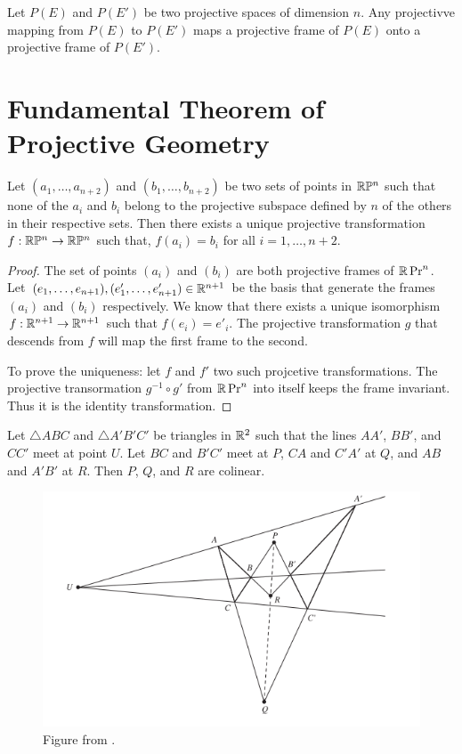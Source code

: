 \begin{prop}
  Let $P(E)$ and $P(E')$ be two projective spaces of dimension $n$. Any projectivve mapping from
  $P(E)$ to $P(E')$ maps a projective frame of $P(E)$ onto a projective frame of $P(E')$.
\end{prop}

\section{Fundamental Theorem of Projective Geometry}

\begin{theorem}
  \label{thm:fundprojgeo}
  Let $(a_1,\ldots,a_{n+2})$ and $(b_1,\ldots,b_{n+2})$ be two sets of points in $\mathbb{R}\mathbb{P}^n$ such
  that none of the $a_i$ and $b_i$ belong to the projective subspace defined by $n$ of the others
  in their respective sets. Then there exists a unique projective transformation
  $f:\mathbb{R}\mathbb{P}^n\rightarrow\mathbb{R}\mathbb{P}^n$ such that, $f(a_i)=b_i$ for all $i=1,\ldots,n+2$.
\end{theorem}

\begin{proof}
  The set of points $(a_i)$ and $(b_i)$ are both projective frames of $\mathbb{R}\Pr^n$. Let
  $(e_1,\ldots,e_{n+1}),(e'_1,\ldots,e'_{n+1})\in\mathbb{R}^{n+1}$ be the basis that generate the frames
  $(a_i)$ and $(b_i)$ respectively. We know that there exists a unique isomorphism
  $f:\mathbb{R}^{n+1}\rightarrow\mathbb{R}^{n+1}$ such that $f(e_i)=e'_i$. The projective transformation $g$
  that descends from $f$ will map the first frame to the second.

  To prove the uniqueness: let $f$ and $f'$ two such projcetive transformations. The projective
  transormation $g^{-1}\circ g'$ from $\mathbb{R}\Pr^n$ into itself keeps the frame invariant. Thus
  it is the identity transformation.
\end{proof}

\begin{theorem}
  Let $\triangle ABC$ and $\triangle A'B'C'$ be triangles in $\mathbb{R}^2$ such that the lines $AA'$,
  $BB'$, and $CC'$ meet at point $U$. Let $BC$ and $B'C'$ meet at $P$, $CA$ and $C'A'$ at $Q$,
  and $AB$ and $A'B'$ at $R$. Then $P$, $Q$, and $R$ are colinear.
\end{theorem}

\begin{figure}[H]
  \center
  \includegraphics[width=0.75\linewidth]{pictures/desargues.png}
  \caption{Figure from \cite{brannan}.}
\end{figure}

